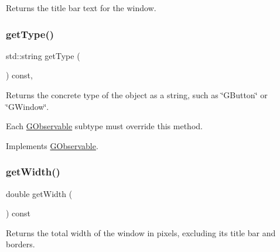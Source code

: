 Returns the title bar text for the window. 

\mbox{\label{classsgl_1_1GWindow_a9b72ede4ee8520f987a0c01e30654814}} 
\subsubsection{\texorpdfstring{get\+Type()}{getType()}}
{\footnotesize\ttfamily std\+::string get\+Type (\begin{DoxyParamCaption}{ }\end{DoxyParamCaption}) const\hspace{0.3cm}{\ttfamily [override]}, {\ttfamily [virtual]}}



Returns the concrete type of the object as a string, such as {\ttfamily \char`\"{}\+G\+Button\char`\"{}} or {\ttfamily \char`\"{}\+G\+Window\char`\"{}}. 

Each \mbox{\hyperlink{classsgl_1_1GObservable}{G\+Observable}} subtype must override this method. 

Implements \mbox{\hyperlink{classsgl_1_1GObservable_a799e073a127b428cc841086d42ea4fed}{G\+Observable}}.

\mbox{\label{classsgl_1_1GWindow_a0ed2965abd4f5701d2cadf71239faf19}} 
\subsubsection{\texorpdfstring{get\+Width()}{getWidth()}}
{\footnotesize\ttfamily double get\+Width (\begin{DoxyParamCaption}{ }\end{DoxyParamCaption}) const\hspace{0.3cm}{\ttfamily [virtual]}}



Returns the total width of the window in pixels, excluding its title bar and borders. 

\mbox{\label{classsgl_1_1GWindow_a344385751bee0720059403940d57a13e}} 
